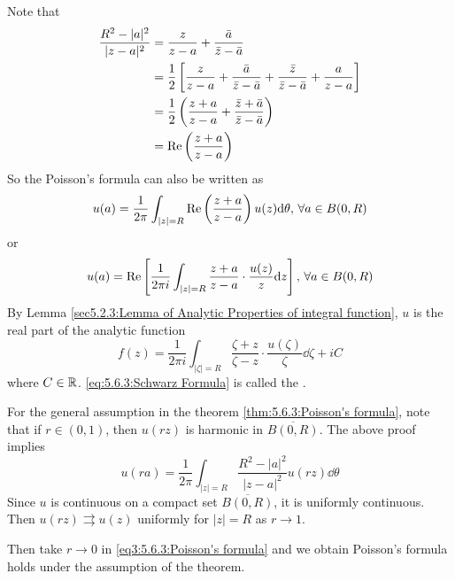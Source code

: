 \begin{remark}
    Note that  
    \begin{equation}
        \begin{aligned}
            \displaystyle\frac{R^2-|a|^2}{|z-a|^2}&=\displaystyle\frac{z}{z-a}+\frac{\bar{a}}{\bar{z}-\bar{a}}\\
            &=\frac{1}{2}\left[\frac{z}{z-a}+\frac{\bar{a}}{\bar{z}-\bar{a}}+\frac{\bar{z}}{\bar{z}-\bar{a}}+\frac{a}{z-a}\right]\\
            &=\frac{1}{2}\left(\frac{z+a}{z-a}+\frac{\bar{z}+\bar{a}}{\bar{z}-\bar{a}}\right)\\
            &=\mathrm{Re}\left(\frac{z+a}{z-a}\right)
        \end{aligned}
    \end{equation}
    So the Poisson's formula can also be written as 
    \begin{equation}
        u(a)=\frac{1}{2\pi }\int_{|z|=R}\mathrm{Re}\left(\frac{z+a}{z-a}\right)u(z)\mathrm{d} \theta,\,\forall a\in B(0,R)\label{eq':5.6.3:another form of Poisson's formula}
    \end{equation}
    or 
    \begin{equation}
        u(a)=\mathrm{Re}\left[\frac{1}{2\pi i}\displaystyle\int_{|z|=R}\frac{z+a}{z-a}\cdot\frac{u(z)}{z}\mathrm{d} z\right],\,\forall a\in B(0,R)\label{eq:5.6.3:Schwarz Formula}
    \end{equation}
    By Lemma \ref{sec5.2.3:Lemma of Analytic Properties of integral function},  $ u  $ is the real part of the analytic function 
    \[f(z)=\frac{1}{2\pi i}\int_{|\zeta|=R}\frac{\zeta+z}{\zeta-z}\cdot\frac{u(\zeta)}{\zeta}\dd \zeta+iC\]
    where  $ C\in\mathbb R $. \eqref{eq:5.6.3:Schwarz Formula} is called the .
\end{remark}
\begin{remark}\label{rmk:5.6.3:general case in the proof of Poisson's formula}
    For the general assumption in the theorem \ref{thm:5.6.3:Poisson's formula}, note that if  $ r\in (0,1) $, then  $ u(rz) $ is harmonic in  $ \overline{B(0,R)} $. The above proof implies 
    \begin{equation}
        u(ra)=\frac{1}{2\pi}\int_{|z|=R}\frac{R^2-|a|^2}{|z-a|^2}u(rz)\dd\theta\label{eq3:5.6.3:Poisson's formula}
    \end{equation} 
    Since   $ u $ is continuous on a compact set  $ \overline{B(0,R)} $, it is uniformly continuous. Then $ u(rz)\rightrightarrows u(z) $ uniformly for  $ |z|=R $ as  $ r\rightarrow 1 $.
    
    Then take  $ r\rightarrow 0 $ in \eqref{eq3:5.6.3:Poisson's formula} and we obtain Poisson's formula  holds under the assumption of the theorem.
\end{remark} 
